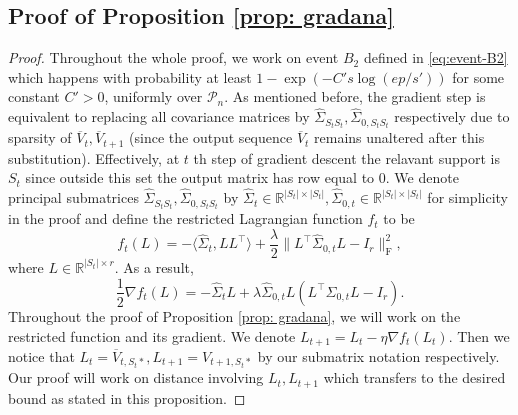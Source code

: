 \documentclass[11pt]{article}
\newcommand{\nb}[1]{\textcolor{orange}{\texttt{[#1]}}}
\newcommand{\gd}{\overline{V}}
\newcommand{\rescov}{\widehat{\Sigma}_{S_tS_t}}
\newcommand{\resdiag}{\widehat{\Sigma}_{0,S_tS_t}}
\newcommand{\sot}{\widehat{\Sigma}_{0,t}}
\newcommand{\0}{{\mathbf{0}}}
\begin{document}
\subsection{Proof of Proposition \ref{prop: gradana}}
\label{sec:proof-gradana}
\begin{proof}
Throughout the whole proof, we work on event $B_2$ defined in \eqref{eq:event-B2} which happens with probability at least $1-\exp(-C's\log(ep/s'))$ for some constant $C'>0$, uniformly over $\mathcal{P}_n$.
As mentioned before, the gradient step is equivalent to replacing all covariance matrices by $\rescov,\resdiag$ respectively due to sparsity of $\gd_t,\gd_{t+1}$ (since the output sequence $\gd_t$ remains unaltered after this substitution). 
Effectively, at $t$ th step of gradient descent the relavant support is $S_t$ since outside this set the output matrix has row equal to 0.
We denote principal submatrices $\rescov,\resdiag$ by $\widehat{\Sigma}_t\in\mathbb{R}^{|S_t|\times |S_t|},\widehat{\Sigma}_{0,t}\in\mathbb{R}^{|S_t|\times |S_t|}$ for simplicity in the proof and define the restricted Lagrangian function $f_t$ to be \begin{equation*}
f_t(L)=-\langle \widehat{\Sigma}_t,LL^\top\rangle+\frac{\lambda}{2}\|L^\top\widehat{\Sigma}_{0,t}L-I_r\|_\mathrm{F}^2,
\end{equation*}
where $L\in \mathbb{R}^{|S_t|\times r}$. As a result,
\begin{equation}
      \label{eq:div-ft}
\frac{1}{2}\nabla f_t(L) = -\widehat{\Sigma}_t L +\lambda\sot L(L^\top\sot L-I_r).
\end{equation}
Throughout the proof of Proposition \ref{prop: gradana}, we will work on the restricted function and its gradient. We denote $L_{t+1}=L_t-\eta \nabla f_t(L_t)$. 
Then we notice that $L_t = \gd_{t,S_t*},L_{t+1}=V_{t+1,S_t*}$ by our submatrix notation respectively. 
Our proof will work on distance involving $L_t,L_{t+1}$ which transfers to the desired bound as stated in this proposition. 


\end{proof}
\end{document}
